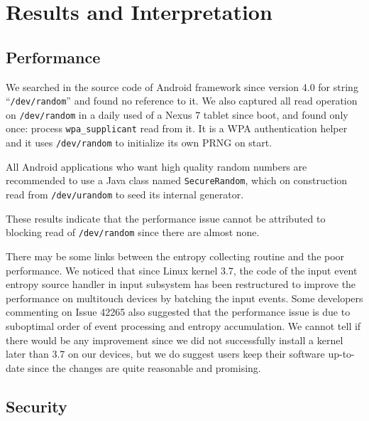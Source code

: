\section{Results and Interpretation}


\subsection{Performance}

We searched in the source code of Android framework since version 4.0 for string ``\verb|/dev/random|'' and found no reference to it. We also captured all read operation on \verb|/dev/random| in a daily used of a Nexus 7 tablet since boot, and found only once: process \verb|wpa_supplicant| read from it. It is a WPA authentication helper and it uses \verb|/dev/random| to initialize its own PRNG on start.

All Android applications who want high quality random numbers are recommended to use a Java class named \verb|SecureRandom|, which on construction read from \verb|/dev/urandom| to seed its internal generator.

These results indicate that the performance issue cannot be attributed to blocking read of \verb|/dev/random| since there are almost none.

There may be some links between the entropy collecting routine and the poor performance. We noticed that since Linux kernel 3.7, the code of the input event entropy source handler in input subsystem has been restructured to improve the performance on multitouch devices by batching the input events\cite{commit43}. Some developers commenting on Issue 42265 also suggested that the performance issue is due to suboptimal order of event processing and entropy accumulation. We cannot tell if there would be any improvement since we did not successfully install a kernel later than 3.7 on our devices, but we do suggest users keep their software up-to-date since the changes are quite reasonable and promising.

\subsection{Security}

